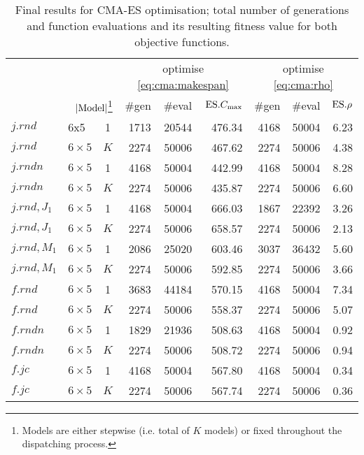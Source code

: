 \begin{table}[t!]\centering
\caption{Final results for CMA-ES optimisation; total number of generations and 
    function evaluations and its resulting fitness value for both objective 
    functions.}\label{tbl:cma:run}
\noindent %
\begin{minipage}{\textwidth}\centering
\begin{tabular}{llcrrrrrr}
    \toprule
    & & & \multicolumn{3}{c}{optimise \cref{eq:cma:makespan}} & 
    \multicolumn{3}{c}{optimise \cref{eq:cma:rho}} \\
    \multicolumn{3}{r}{\Problem{\train} \quad 
    $\lvert\text{Model}\rvert$\footnote{Models are either stepwise (i.e. 
        total of $K$ models) or fixed throughout the dispatching 
        process.}} &
        \#gen & \#eval & $\text{ES}.{C_{\max}}$ & \#gen & \#eval & $\text{ES}.{\rho}$ \\ 
    \midrule
    $j.rnd$ & 6x5 & 1 & 1713 & 20544 & 476.34 & 4168 & 50004 & 6.23 \\ 
    $j.rnd$ & $6\times5$ & $K$ & 2274 & 50006 & 467.62 & 2274 & 50006 & 4.38 \\ 
    $j.rndn$ & $6\times5$ & 1 & 4168 & 50004 & 442.99 & 4168 & 50004 & 8.28 \\ 
    $j.rndn$ & $6\times5$ & $K$ & 2274 & 50006 & 435.87 & 2274 & 50006 & 6.60 
    \\ 
    $j.rnd,J_1$ & $6\times5$ & 1 & 4168 & 50004 & 666.03 & 1867 & 22392 & 3.26 
    \\ 
    $j.rnd,J_1$ & $6\times5$ & $K$ & 2274 & 50006 & 658.57 & 2274 & 50006 & 
    2.13 \\ 
    $j.rnd,M_1$ & $6\times5$ & 1 & 2086 & 25020 & 603.46 & 3037 & 36432 & 5.60 
    \\ 
    $j.rnd,M_1$ & $6\times5$ & $K$ & 2274 & 50006 & 592.85 & 2274 & 50006 & 
    3.66 \\ 
    $f.rnd$ & $6\times5$ & 1 & 3683 & 44184 & 570.15 & 4168 & 50004 & 7.34 \\ 
    $f.rnd$ & $6\times5$ & $K$ & 2274 & 50006 & 558.37 & 2274 & 50006 & 5.07 \\ 
    $f.rndn$ & $6\times5$ & 1 & 1829 & 21936 & 508.63 & 4168 & 50004 & 0.92 \\ 
    $f.rndn$ & $6\times5$ & $K$ & 2274 & 50006 & 508.72 & 2274 & 50006 & 0.94 
    \\ 
    $f.jc$ & $6\times5$ & 1 & 4168 & 50004 & 567.80 & 4168 & 50004 & 0.34 \\ 
    $f.jc$ & $6\times5$ & $K$ & 2274 & 50006 & 567.74 & 2274 & 50006 & 0.36 \\ 

\end{tabular}
\end{minipage}
\end{table}

